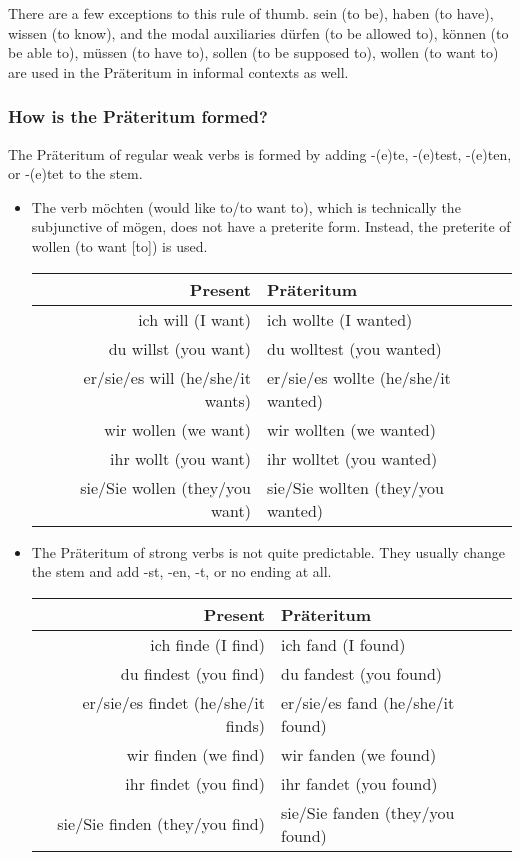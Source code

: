 There are a few exceptions to this rule of thumb. sein (to be), haben (to have), wissen (to know), and the modal auxiliaries d{\"u}rfen (to be allowed to), k{\"o}nnen (to be able to), m{\"u}ssen (to have to), sollen (to be supposed to), wollen (to want to) are used in the Pr{\"a}teritum in informal contexts as well.



\subsubsection{How is the Pr{\"a}teritum formed?}

The Pr{\"a}teritum of regular weak verbs is formed by adding -(e)te, -(e)test, -(e)ten, or -(e)tet to the stem.

\begin{itemize}
  \item  The verb m{\"o}chten (would like to/to want to), which is technically the subjunctive of m{\"o}gen, does not have a preterite form. Instead, the preterite of wollen (to want [to]) is used.
  
  \begin{center}\begin{tabular}{r|l}
    \textbf{Present} & \textbf{Pr{\"a}teritum} \\
    \hline
    ich will (I want) & ich wollte (I wanted) \\
    du willst (you want) & du wolltest (you wanted) \\
    er/sie/es will (he/she/it wants) & er/sie/es wollte (he/she/it wanted) \\
    wir wollen (we want) & wir wollten (we wanted) \\
    ihr wollt (you want) & ihr wolltet (you wanted) \\
    sie/Sie wollen (they/you want) & sie/Sie wollten (they/you wanted) \\
  \end{tabular}\end{center}
  
  \item  The Pr{\"a}teritum of strong verbs is not quite predictable. They usually change the stem and add -st, -en, -t, or no ending at all.
  
  \begin{center}\begin{tabular}{r|l}
    \textbf{Present} & \textbf{Pr{\"a}teritum} \\
    \hline
    ich finde (I find) & ich fand (I found) \\
    du findest (you find) & du fandest (you found) \\
    er/sie/es findet (he/she/it finds) & er/sie/es fand (he/she/it found) \\
    wir finden (we find) & wir fanden (we found) \\
    ihr findet (you find) & ihr fandet (you found) \\
    sie/Sie finden (they/you find) & sie/Sie fanden (they/you found) \\
  \end{tabular}\end{center}
  

\end{itemize}
